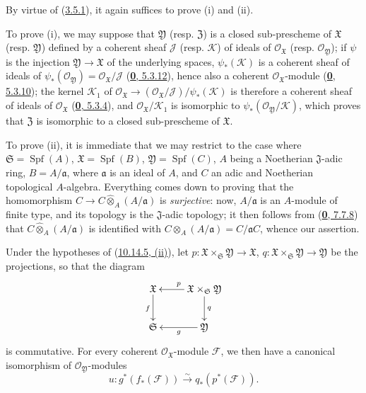 By virtue of (\hyperref[I.3.5.1]{3.5.1}), it again suffices to prove (i)
and (ii).

To prove (i), we may suppose that $\mathfrak{Y}$ (resp.
$\mathfrak{Z}$) is a closed sub-prescheme of $\mathfrak{X}$ (resp.
$\mathfrak{Y}$) defined by a coherent sheaf $\mathscr{J}$ (resp.
$\mathscr{K}$) of ideals of $\mathscr{O}_{\mathfrak{X}}$ (resp.
$\mathscr{O}_{\mathfrak{Y}}$); if $\psi$ is the injection
$\mathfrak{Y}\to\mathfrak{X}$ of the underlying spaces,
$\psi_*(\mathscr{K})$ is a coherent sheaf of ideals of
$\psi_*(\mathscr{O}_{\mathfrak{Y}})
=\mathscr{O}_{\mathfrak{X}}/\mathscr{J}$
(\hyperref[0.5.3.12]{\textbf{0}, 5.3.12}), hence also a
coherent $\mathscr{O}_{\mathfrak{X}}$-module
(\hyperref[0.5.3.10]{\textbf{0}, 5.3.10}); the kernel $\mathscr{K}_1$ of
$\mathscr{O}_{\mathfrak{X}}\to
(\mathscr{O}_{\mathfrak{X}}/\mathscr{J})/\psi_*(\mathscr{K})$ is therefore a
coherent sheaf of ideals of $\mathscr{O}_{\mathfrak{X}}$
(\hyperref[0.5.3.4]{\textbf{0}, 5.3.4}), and
$\mathscr{O}_{\mathfrak{X}}/\mathscr{K}_1$ is isomorphic to
$\psi_*(\mathscr{O}_{\mathfrak{Y}}/\mathscr{K})$, which proves that
$\mathfrak{Z}$ is isomorphic to a closed sub-prescheme of $\mathfrak{X}$.

To prove (ii), it is immediate that we may restrict to the case where
$\mathfrak{S}=\operatorname{Spf}(A)$,
$\mathfrak{X}=\operatorname{Spf}(B)$,
$\mathfrak{Y}=\operatorname{Spf}(C)$, $A$ being a Noetherian
$\mathfrak{J}$-adic ring, $B=A/\mathfrak{a}$, where $\mathfrak{a}$ is
an ideal of $A$, and $C$ an adic and Noetherian topological $A$-algebra.
Everything comes down to proving that the homomorphism
$C\to C\widehat{\otimes}_A(A/\mathfrak{a})$ is \emph{surjective}: now,
$A/\mathfrak{a}$ is an $A$-module of finite type, and its topology is the
$\mathfrak{J}$-adic topology; it then follows from
(\hyperref[0.7.7.8]{\textbf{0}, 7.7.8}) that
$C\widehat{\otimes}_A(A/\mathfrak{a})$ is identified with
$C\otimes_A(A/\mathfrak{a})=C/\mathfrak{a}C$, whence our assertion.

\begin{corollary}[10.14.6]
\label{I.10.14.6}
Under the hypotheses of \textup{(\hyperref[I.10.14.5]{10.14.5, (ii)})}, let
$p:\mathfrak{X}\times_{\mathfrak{S}}\mathfrak{Y}\to\mathfrak{X}$,
$q:\mathfrak{X}\times_{\mathfrak{S}}\mathfrak{Y}\to\mathfrak{Y}$ be the
projections, so that the diagram
\[
  \xymatrix{
    \mathfrak{X} \ar[d]_{f}
    & \mathfrak{X}\times_{\mathfrak{S}}\mathfrak{Y}
      \ar[l]_{p} \ar[d]^{q}\\
    \mathfrak{S}
    & \mathfrak{Y} \ar[l]^{g}
  }
\]
is commutative. For every coherent $\mathscr{O}_{\mathfrak{X}}$-module
$\mathscr{F}$, we then have a canonical isomorphism of
$\mathscr{O}_{\mathfrak{Y}}$-modules
\[
  \label{I.10.14.6.1}
  u:g^*(f_*(\mathscr{F}))
  \xrightarrow{\sim}
  q_*(p^*(\mathscr{F})).
  \tag{10.14.6.1}
\]
\end{corollary}

